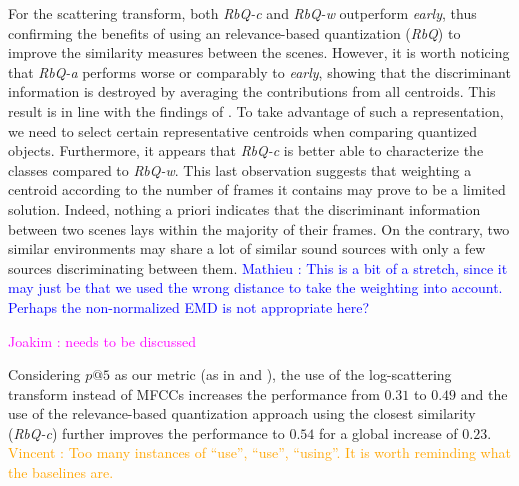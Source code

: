 \documentclass[smallextended]{svjour3}
\newcommand{\vl}[1]{\textcolor{orange}{Vincent : #1}}
\newcommand{\ja}[1]{\textcolor{magenta}{Joakim : #1}}
\newcommand{\ml}[1]{\textcolor{blue}{ Mathieu : #1}}
\begin{document}
For the scattering transform, both \emph{RbQ-c} and \emph{RbQ-w} outperform \emph{early}, thus confirming the benefits of using an relevance-based quantization (\emph{RbQ}) to improve the similarity measures between the scenes. However, it is worth noticing that \emph{RbQ-a} performs worse or comparably to \emph{early}, showing that the discriminant information is destroyed by averaging the contributions from all centroids. This result is in line with the findings of \cite{lagrange:hal-01082501}. To take advantage of such a representation, we need to select certain representative centroids when comparing quantized objects. Furthermore, it appears that \emph{RbQ-c} is better able to characterize the classes compared to \emph{RbQ-w}. This last observation suggests that weighting a centroid according to the number of frames it contains may prove to be a limited solution. Indeed, nothing a priori indicates that the discriminant information between two scenes lays within the majority of their frames. On the contrary, two similar environments may share a lot of similar sound sources with only a few sources discriminating between them. \ml{This is a bit of a stretch, since it may just be that we used the wrong distance to take the weighting into account. Perhaps the non-normalized EMD is not appropriate here?}

\ja{needs to be discussed}

Considering $p@5$ as our metric (as in \cite{aucouturier2007bag} and \cite{lagrange:hal-01082501}), the use of the log-scattering transform instead of MFCCs increases the performance from $0.31$ to $0.49$ and the use of the relevance-based quantization approach using the closest similarity (\emph{RbQ-c}) further improves the performance to $0.54$ for a global increase of $0.23$. \vl{Too many instances of ``use'', ``use'', ``using''. It is worth reminding what the baselines are.}


\end{document}

